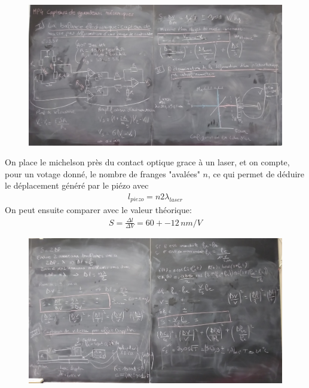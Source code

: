 \documentclass[12pt,prb,aps,epsf]{report}
\begin{document}
\begin{figure}[h]
	\centerline{\includegraphics[width=18cm]{P_20181010_095430}}
\end{figure}
On place le michelson près du contact optique grace à un laser, et on compte, pour un votage donné, le nombre de franges "avalées" $n$, ce qui permet de déduire le déplacement généré par le piézo avec 
\begin{eqnarray}
l_{piezo} = n2\lambda_{laser}
\end{eqnarray}
On peut ensuite comparer avec le valeur théorique: 
\begin{eqnarray}
S = \frac{\Delta l}{\Delta V} = 60 +- 12\, nm/V
\end{eqnarray}
\begin{figure}
	\centerline{\includegraphics[width=18cm]{P_20181010_095444}}
\end{figure}
\end{document}
